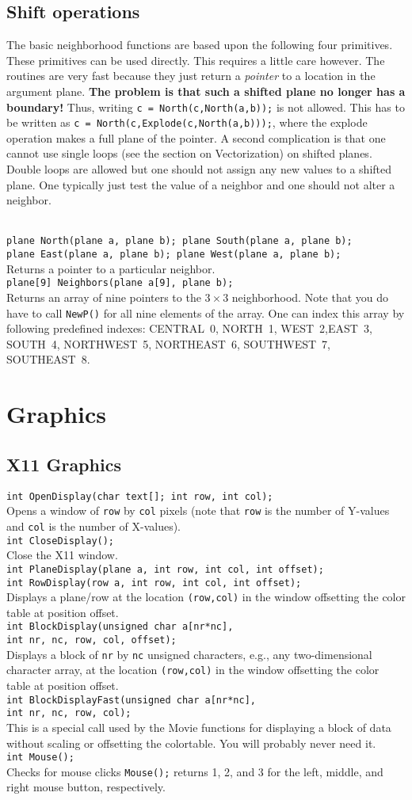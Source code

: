 \documentclass[12pt]{article}
\newcommand{\mtt}[1]{\texttt{\\#1\\}}
\begin{document}
\subsection{Shift operations}
The basic neighborhood functions are based upon the
following four primitives. These primitives can be used
directly. This requires a little care however. The routines
are very fast because they just return a {\sl pointer} to a location
in the argument plane. {\bf The problem is that such a shifted plane
no longer has a boundary!} 
Thus, writing {\tt c = North(c,North(a,b));} is not allowed. 
This has to be written as
{\tt c = North(c,Explode(c,North(a,b)));}, where the explode operation
makes a full plane of the pointer.
A second complication is that one cannot use single loops 
(see the section on Vectorization) on shifted planes.
Double loops are allowed but one should not assign any new
values to a shifted plane. One typically just test the value of
a neighbor and one should not alter a neighbor.

\mtt{ 
plane North(plane a, plane b); plane South(plane a, plane b);\\
plane East(plane a, plane b); plane West(plane a, plane b);
}
Returns a pointer to a particular neighbor.
\mtt{ plane[9] Neighbors(plane a[9], plane b);}
Returns an array of nine pointers to the $3\times 3$ neighborhood.
Note that you do have to call {\tt NewP()} for all nine elements of the array.
One can index this array by following predefined indexes: CENTRAL~0,
NORTH~1, WEST~2,EAST~3, SOUTH~4,
NORTHWEST~5, NORTHEAST~6, SOUTHWEST~7, SOUTHEAST~8.

\section{Graphics}
\subsection{X11 Graphics}
\texttt{int OpenDisplay(char text[]; int row, int col);\\}
Opens a window of {\tt row} by {\tt col} pixels
(note that {\tt row} is the number of Y-values and {\tt col}
is the number of X-values).
\mtt{int CloseDisplay();}
Close the X11 window.
\mtt{ 
int PlaneDisplay(plane a, int row, int col, int offset);\\
int RowDisplay(row a, int row, int col, int offset);
}
Displays a plane/row at the location {\tt (row,col)} in the window offsetting
the color table at position offset.
\mtt{int BlockDisplay(unsigned char a[nr*nc],\\
int nr, nc, row, col, offset);}
Displays a block of {\tt nr} by {\tt nc} unsigned characters,
e.g., any two-dimensional character array,
at the location {\tt (row,col)} in the window offsetting
the color table at position offset.
\mtt{int BlockDisplayFast(unsigned char a[nr*nc],\\int nr, nc, row, col);}
This is a special call used by the Movie functions for displaying a block
of data without scaling or offsetting the colortable. You will
probably never need it.
\mtt{ int Mouse();}
Checks for mouse clicks {\tt Mouse();} returns 1, 2, and 3 for
the left, middle, and right mouse button, respectively.
\end{document}
